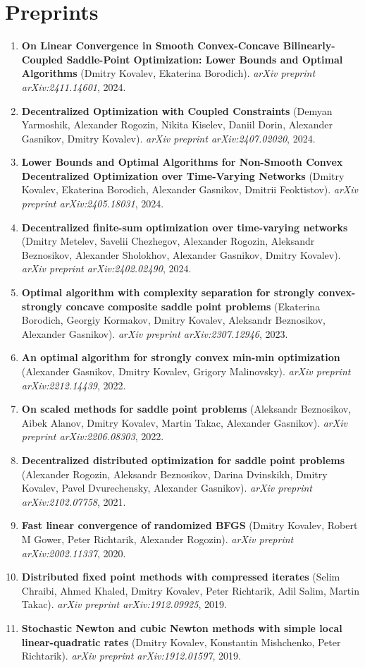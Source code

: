 \section{Preprints}
\begin{enumerate}
\item
\textbf{On Linear Convergence in Smooth Convex-Concave Bilinearly-Coupled Saddle-Point Optimization: Lower Bounds and Optimal Algorithms} (Dmitry Kovalev, Ekaterina Borodich). \textit{arXiv preprint arXiv:2411.14601}, 2024.
\item
\textbf{Decentralized Optimization with Coupled Constraints} (Demyan Yarmoshik, Alexander Rogozin, Nikita Kiselev, Daniil Dorin, Alexander Gasnikov, Dmitry Kovalev). \textit{arXiv preprint arXiv:2407.02020}, 2024.
\item
\textbf{Lower Bounds and Optimal Algorithms for Non-Smooth Convex Decentralized Optimization over Time-Varying Networks} (Dmitry Kovalev, Ekaterina Borodich, Alexander Gasnikov, Dmitrii Feoktistov). \textit{arXiv preprint arXiv:2405.18031}, 2024.
\item
\textbf{Decentralized finite-sum optimization over time-varying networks} (Dmitry Metelev, Savelii Chezhegov, Alexander Rogozin, Aleksandr Beznosikov, Alexander Sholokhov, Alexander Gasnikov, Dmitry Kovalev). \textit{arXiv preprint arXiv:2402.02490}, 2024.
\item
\textbf{Optimal algorithm with complexity separation for strongly convex-strongly concave composite saddle point problems} (Ekaterina Borodich, Georgiy Kormakov, Dmitry Kovalev, Aleksandr Beznosikov, Alexander Gasnikov). \textit{arXiv preprint arXiv:2307.12946}, 2023.
\item
\textbf{An optimal algorithm for strongly convex min-min optimization} (Alexander Gasnikov, Dmitry Kovalev, Grigory Malinovsky). \textit{arXiv preprint arXiv:2212.14439}, 2022.
\item
\textbf{On scaled methods for saddle point problems} (Aleksandr Beznosikov, Aibek Alanov, Dmitry Kovalev, Martin Takac, Alexander Gasnikov). \textit{arXiv preprint arXiv:2206.08303}, 2022.
\item
\textbf{Decentralized distributed optimization for saddle point problems} (Alexander Rogozin, Aleksandr Beznosikov, Darina Dvinskikh, Dmitry Kovalev, Pavel Dvurechensky, Alexander Gasnikov). \textit{arXiv preprint arXiv:2102.07758}, 2021.
\item
\textbf{Fast linear convergence of randomized BFGS} (Dmitry Kovalev, Robert M Gower, Peter Richtarik, Alexander Rogozin). \textit{arXiv preprint arXiv:2002.11337}, 2020.
\item
\textbf{Distributed fixed point methods with compressed iterates} (Selim Chraibi, Ahmed Khaled, Dmitry Kovalev, Peter Richtarik, Adil Salim, Martin Takac). \textit{arXiv preprint arXiv:1912.09925}, 2019.
\item
\textbf{Stochastic Newton and cubic Newton methods with simple local linear-quadratic rates} (Dmitry Kovalev, Konstantin Mishchenko, Peter Richtarik). \textit{arXiv preprint arXiv:1912.01597}, 2019.
\end{enumerate}
